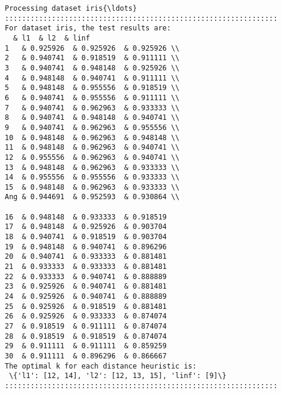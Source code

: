 \documentclass[11pt]{article}
\begin{document}
    \begin{Verbatim}[commandchars=\\\{\}]
Processing dataset iris{\ldots}
::::::::::::::::::::::::::::::::::::::::::::::::::::::::::::::::
For dataset iris, the test results are:
  & l1  & l2  & linf
1   & 0.925926  & 0.925926  & 0.925926 \\
2   & 0.940741  & 0.918519  & 0.911111 \\
3   & 0.940741  & 0.948148  & 0.925926 \\
4   & 0.948148  & 0.940741  & 0.911111 \\
5   & 0.948148  & 0.955556  & 0.918519 \\
6   & 0.940741  & 0.955556  & 0.911111 \\
7   & 0.940741  & 0.962963  & 0.933333 \\
8   & 0.940741  & 0.948148  & 0.940741 \\
9   & 0.940741  & 0.962963  & 0.955556 \\
10  & 0.948148  & 0.962963  & 0.948148 \\
11  & 0.948148  & 0.962963  & 0.940741 \\
12  & 0.955556  & 0.962963  & 0.940741 \\
13  & 0.948148  & 0.962963  & 0.933333 \\
14  & 0.955556  & 0.955556  & 0.933333 \\
15  & 0.948148  & 0.962963  & 0.933333 \\
Ang & 0.944691  & 0.952593  & 0.930864 \\

16  & 0.948148  & 0.933333  & 0.918519
17  & 0.948148  & 0.925926  & 0.903704
18  & 0.940741  & 0.918519  & 0.903704
19  & 0.948148  & 0.940741  & 0.896296
20  & 0.940741  & 0.933333  & 0.881481
21  & 0.933333  & 0.933333  & 0.881481
22  & 0.933333  & 0.940741  & 0.888889
23  & 0.925926  & 0.940741  & 0.881481
24  & 0.925926  & 0.940741  & 0.888889
25  & 0.925926  & 0.918519  & 0.881481
26  & 0.925926  & 0.933333  & 0.874074
27  & 0.918519  & 0.911111  & 0.874074
28  & 0.918519  & 0.918519  & 0.874074
29  & 0.911111  & 0.911111  & 0.859259
30  & 0.911111  & 0.896296  & 0.866667
The optimal k for each distance heuristic is:
 \{'l1': [12, 14], 'l2': [12, 13, 15], 'linf': [9]\}
::::::::::::::::::::::::::::::::::::::::::::::::::::::::::::::::

    \end{Verbatim}
\end{document}
